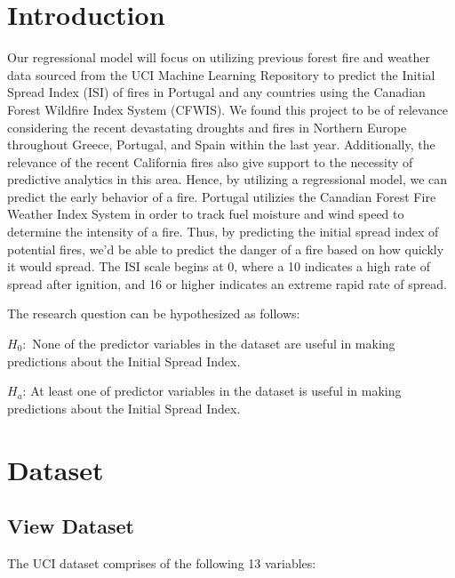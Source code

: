 \documentclass[conference,final,]{IEEEtran}
\begin{document}
\hypertarget{introduction}{%
\section{Introduction}\label{introduction}}

Our regressional model will focus on utilizing previous forest fire and
weather data sourced from the UCI Machine Learning Repository to predict
the Initial Spread Index (ISI) of fires in Portugal and any countries
using the Canadian Forest Wildfire Index System (CFWIS). We found this
project to be of relevance considering the recent devastating droughts
and fires in Northern Europe throughout Greece, Portugal, and Spain
within the last year. Additionally, the relevance of the recent
California fires also give support to the necessity of predictive
analytics in this area. Hence, by utilizing a regressional model, we can
predict the early behavior of a fire. Portugal utilizies the Canadian
Forest Fire Weather Index System in order to track fuel moisture and
wind speed to determine the intensity of a fire. Thus, by predicting the
initial spread index of potential fires, we'd be able to predict the
danger of a fire based on how quickly it would spread. The ISI scale
begins at 0, where a 10 indicates a high rate of spread after ignition,
and 16 or higher indicates an extreme rapid rate of spread.

The research question can be hypothesized as follows:

\(H_{0}:\) None of the predictor variables in the dataset are useful in
making predictions about the Initial Spread Index.

\(H_{a}\): At least one of predictor variables in the dataset is useful
in making predictions about the Initial Spread Index.

\hypertarget{dataset}{%
\section{Dataset}\label{dataset}}

\hypertarget{view-dataset}{%
\subsection{View Dataset}\label{view-dataset}}

The UCI dataset comprises of the following 13 variables:
\end{document}
